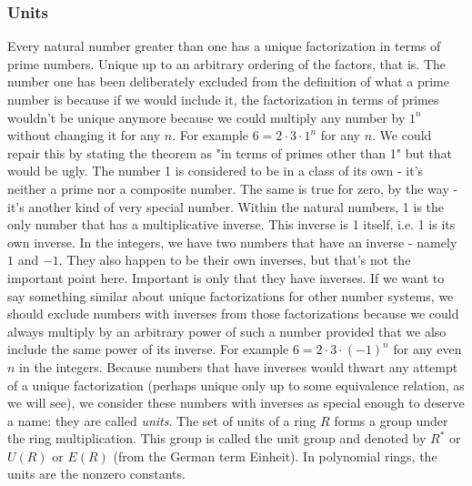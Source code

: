 



\subsubsection{Units}
Every natural number greater than one has a unique factorization in terms of prime numbers. Unique up to an arbitrary ordering of the factors, that is. The number one has been deliberately excluded from the definition of what a prime number is because if we would include it, the factorization in terms of primes wouldn't be unique anymore because we could multiply any number by $1^n$ without changing it for any $n$. For example $6 = 2 \cdot 3 \cdot 1^n$ for any $n$. We could repair this by stating the theorem as "in terms of primes other than 1" but that would be ugly. The number 1 is considered to be in a class of its own - it's neither a prime nor a composite number. The same is true for zero, by the way - it's another kind of very special number. Within the natural numbers, 1 is the only number that has a multiplicative inverse. This inverse is 1 itself, i.e. 1 is its own inverse. In the integers, we have two numbers that have an inverse - namely $1$ and $-1$. They also happen to be their own inverses, but that's not the important point here. Important is only that they have inverses. If we want to say something similar about unique factorizations for other number systems, we should exclude numbers with inverses from those factorizations because we could always multiply by an arbitrary power of such a number provided that we also include the same power of its inverse. For example $6 = 2 \cdot 3 \cdot (-1)^n$ for any even $n$ in the integers. Because numbers that have inverses would thwart any attempt of a unique factorization (perhaps unique only up to some equivalence relation, as we will see), we consider these numbers with inverses as special enough to deserve a name: they are called \emph{units}. The set of units of a ring $R$ forms a group under the ring multiplication. This group is called the unit group and denoted by $R^*$ or $U(R)$ or $E(R)$ (from the German term Einheit). In polynomial rings, the units are the nonzero constants. 

